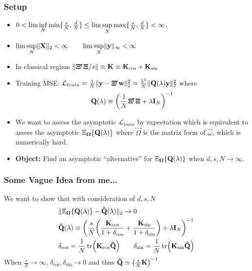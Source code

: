 \documentclass[10pt]{../formats/RU}
\begin{document}
\begin{frame}
  \frametitle{Setup}
  \begin{itemize}
    \item $0< \lim\inf\limits_N\min\braces{\frac{s}{N},\frac{d}{N}}\leq \lim\sup\limits_N\max\braces{\frac{s}{N},\frac{d}{N}}<\infty$.
    \item $\lim\sup\limits_N\norm{\mathbf{X}}_2<\infty \qquad \lim\sup\limits_N\norm{\vec{y}}_{\infty}<\infty$ 
    \item In classical regime $\norm{\mathbf{\Xi}\trn\mathbf{\Xi}/s}\equiv \mathbf{K}\equiv\mathbf{K}_{\cos}+\mathbf{K}_{\sin}$
    \item Training MSE: $\mathcal{L}_{train}=\frac{1}{N}\norm{\vec{y}-\mathbf{\Xi}\trn\vec{w}}_2^2=\frac{\lambda^2}{N}\norm{\mathbf{Q}(\lambda)\vec{y}}_2^2$ where 
    \begin{align*}
      \mathbf{Q}(\lambda)\equiv\parens*{\frac{1}{N}\mathbf{\Xi}\trn\mathbf{\Xi}+\lambda\mathbf{I}_N}^{-1}
    \end{align*}
    \item We want to assess the asymptotic $\mathcal{L}_{train}$ by expectation which is equivalent to assess the asymptotic $\mathbb{E}_{\vec{\Omega}}\braces{\mathbf{Q}(\lambda)}$ where $\vec{\Omega}$ is the matrix form of $\vec{\omega}$, which is numerically hard.
    \item \textbf{Object:} Find an asymptotic ``alternative'' for $\mathbb{E}_{\vec{\Omega}}\braces{\mathbf{Q}(\lambda)}$ when $d, s, N\rightarrow\infty$.
  \end{itemize}
\end{frame}
\begin{frame}
  \frametitle{Some Vague Idea from me...}
  We want to show that with consideration of $d, s, N$
  \begin{align*}
    &\norm{\mathbb{E}_{\vec{\Omega}}\braces{\mathbf{Q}(\lambda)}-\mathbf{\hat{Q}}(\lambda)}_2\rightarrow 0 \\
    &\mathbf{\hat{Q}}(\lambda)\equiv\parens*{\frac{s}{N}\parens*{\frac{\vec{K}_{\cos}}{1+\delta_{\cos}}+\frac{\vec{K}_{\sin}}{1+\delta_{\sin}}}+\lambda\mathbf{I}_N}^{-1} \\
    &\delta_{\cos}=\frac{1}{N}\tr\parens*{\vec{K}_{\cos}\vec{\hat{\vec{Q}}}} \qquad \delta_{\sin}=\frac{1}{N}\tr\parens*{\vec{K}_{\sin}\vec{\hat{\vec{Q}}}}
  \end{align*}
  When $\frac{s}{N}\rightarrow\infty$, $\delta_{\cos},\delta_{\sin}\rightarrow 0$ and thus $\mathbf{\hat{Q}}\simeq \parens*{\frac{s}{N}\mathbf{K}}^{-1}$
\end{frame}
\end{document}
